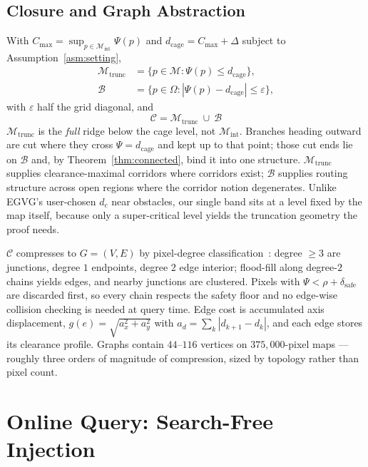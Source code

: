\documentclass[conference]{IEEEtran}
\begin{document}
\subsection{Closure and Graph Abstraction}
\label{sec:closure}

With $C_{\max}=\sup_{p\in\mathcal{M}_{\mathrm{int}}}\Psi(p)$ and $d_{\mathrm{cage}}=C_{\max}+\Delta$ subject to Assumption~\ref{asm:setting},
\begin{align}
\mathcal{M}_{\mathrm{trunc}} &= \{p\in\mathcal{M}: \Psi(p)\le d_{\mathrm{cage}}\}, \label{eq:trunc}\\
\mathcal{B} &= \{p\in\Omega: |\Psi(p)-d_{\mathrm{cage}}|\le\varepsilon\},
\end{align}
with $\varepsilon$ half the grid diagonal, and
\begin{equation}
\boxed{\ \mathcal{C}=\mathcal{M}_{\mathrm{trunc}}\ \cup\ \mathcal{B}\ }
\label{eq:cage}
\end{equation}
$\mathcal{M}_{\mathrm{trunc}}$ is the \emph{full} ridge below the cage level, not $\mathcal{M}_{\mathrm{int}}$. Branches heading outward are cut where they cross $\Psi=d_{\mathrm{cage}}$ and kept up to that point; those cut ends lie on $\mathcal{B}$ and, by Theorem~\ref{thm:connected}, bind it into one structure. $\mathcal{M}_{\mathrm{trunc}}$ supplies clearance-maximal corridors where corridors exist; $\mathcal{B}$ supplies routing structure across open regions where the corridor notion degenerates. Unlike EGVG's user-chosen $d_c$ near obstacles, our single band sits at a level fixed by the map itself, because only a super-critical level yields the truncation geometry the proof needs.

$\mathcal{C}$ compresses to $G=(V,E)$ by pixel-degree classification~\cite{qi2025egvg,lau2013}: degree $\ge 3$ are junctions, degree $1$ endpoints, degree $2$ edge interior; flood-fill along degree-$2$ chains yields edges, and nearby junctions are clustered. Pixels with $\Psi<\rho+\delta_{\mathrm{safe}}$ are discarded first, so every chain respects the safety floor and no edge-wise collision checking is needed at query time. Edge cost is accumulated axis displacement, $g(e)=\sqrt{a_x^2+a_y^2}$ with $a_d=\sum_k|d_{k+1}-d_k|$, and each edge stores its clearance profile. Graphs contain $44$--$116$ vertices on $375{,}000$-pixel maps --- roughly three orders of magnitude of compression, sized by topology rather than pixel count.

\section{Online Query: Search-Free Injection}
\label{sec:online}
\end{document}
